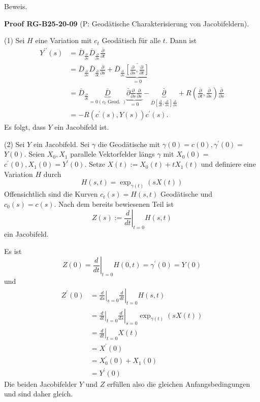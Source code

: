 \documentclass[10pt, letterpaper]{article}
\newcommand{\CustomHeading}[3]{%
  \par\medskip\noindent%
  \textbf{#1 #2} \textnormal{(#3)}.\enskip%
}
\newenvironment{PROOF}[2]{\begin{unitbox}\CustomHeading{Proof}{#1}{#2}}{\end{unitbox}}
\begin{document}
Beweis. 

\begin{PROOF}{RG-B25-20-09}{P: Geodätische Charakterisierung von Jacobifeldern}
(1) Sei $H$ eine Variation mit $c_{t}$ Geodätisch für alle $t$. Dann ist
$$
\begin{aligned}
Y^{\prime \prime}(s) & =\bar{D}_{\frac{\partial}{\partial s}} \bar{D}_{\frac{\partial}{\partial s}} \frac{\bar{\partial}}{\partial t} \\
& =\bar{D}_{\frac{\partial}{\partial s}} \bar{D}_{\frac{\partial}{\partial t}} \frac{\bar{\partial}}{\partial s}+\bar{D}_{\frac{\partial}{\partial s}} \underbrace{\overline{\left[\frac{\partial}{\partial s}, \frac{\partial}{\partial t}\right]}}_{=0} \\
& =\bar{D}_{\frac{\partial}{\partial t}} \underbrace{\bar{D}}_{=0\left(c_{t} \text { Geod. }\right)} \underbrace{\bar{\partial} \frac{\partial}{\partial s} \frac{\partial}{\partial s}}_{=0}-\underbrace{\bar{\partial}}_{\bar{D}\left[\frac{\partial}{\partial t}, \frac{\partial}{\partial s}\right] \frac{\partial}{\partial s}}+R\left(\frac{\bar{\partial}}{\partial t}, \frac{\bar{\partial}}{\partial s}\right) \frac{\bar{\partial}}{\partial s} \\
& =-R\left(c^{\prime}(s), Y(s)\right) c^{\prime}(s) .
\end{aligned}
$$
Es folgt, dass $Y$ ein Jacobifeld ist.

(2) Sei $Y$ ein Jacobifeld. Sei $\gamma$ die Geodätische mit $\gamma(0)=c(0), \gamma^{\prime}(0)=$ $Y(0)$. Seien $X_{0}, X_{1}$ parallele Vektorfelder längs $\gamma$ mit $X_{0}(0)=$ $c^{\prime}(0), X_{1}(0)=Y^{\prime}(0)$. Setze $X(t):=X_{0}(t)+t X_{1}(t)$ und definiere eine Variation $H$ durch
$$
H(s, t)=\exp _{\gamma(t)}(s X(t))
$$
Offensichtlich sind die Kurven $c_{t}(s)=H(s, t)$ Geodätische und $c_{0}(s)=c(s)$. Nach dem bereits bewiesenen Teil ist
$$
Z(s):=\left.\frac{d}{d t}\right|_{t=0} H(s, t)
$$
ein Jacobifeld.

Es ist
$$
Z(0)=\left.\frac{d}{d t}\right|_{t=0} H(0, t)=\gamma^{\prime}(0)=Y(0)
$$
und
$$
\begin{aligned}
Z^{\prime}(0) & =\left.\left.\frac{d}{d s}\right|_{s=0} \frac{d}{d t}\right|_{t=0} H(s, t) \\
& =\left.\left.\frac{d}{d t}\right|_{t=0} \frac{d}{d s}\right|_{s=0} \exp _{\gamma(t)}(s X(t)) \\
& =\left.\frac{d}{d t}\right|_{t=0} X(t) \\
& =X^{\prime}(0) \\
& =X_{0}^{\prime}(0)+X_{1}(0) \\
& =Y^{\prime}(0)
\end{aligned}
$$
Die beiden Jacobifelder $Y$ und $Z$ erfüllen also die gleichen Anfangsbedingungen und sind daher gleich.
\end{PROOF}
\end{document}
